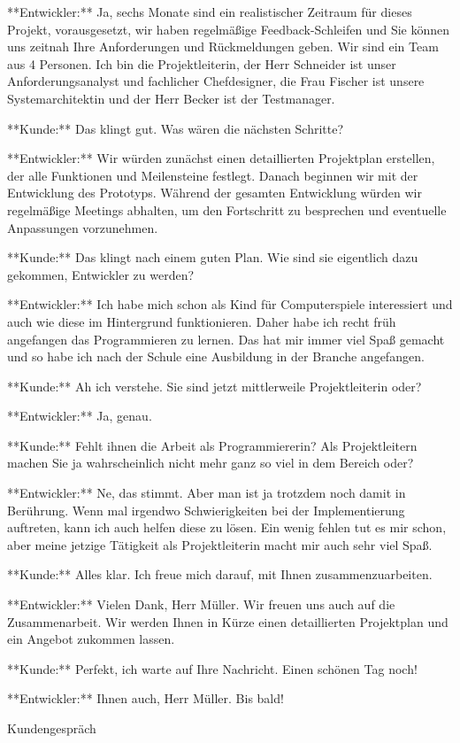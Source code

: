 \begin{prompt}[H]
    \begin{tcolorbox}[colback=gray!20, colframe=gray!20, boxrule=0pt, sharp corners] 
        **Entwickler:** Ja, sechs Monate sind ein realistischer Zeitraum für dieses Projekt, vorausgesetzt, wir haben regelmäßige Feedback-Schleifen und Sie können uns zeitnah Ihre Anforderungen und Rückmeldungen geben. Wir sind ein Team aus 4 Personen. Ich bin die Projektleiterin, der Herr Schneider ist unser Anforderungsanalyst und fachlicher Chefdesigner, die Frau Fischer ist unsere Systemarchitektin und der Herr Becker ist der Testmanager.
        
        **Kunde:** Das klingt gut. Was wären die nächsten Schritte?

        **Entwickler:** Wir würden zunächst einen detaillierten Projektplan erstellen, der alle Funktionen und Meilensteine festlegt. Danach beginnen wir mit der Entwicklung des Prototyps. Während der gesamten Entwicklung würden wir regelmäßige Meetings abhalten, um den Fortschritt zu besprechen und eventuelle Anpassungen vorzunehmen.
        
        **Kunde:** Das klingt nach einem guten Plan. Wie sind sie eigentlich dazu gekommen, Entwickler zu werden?
        
        **Entwickler:** Ich habe mich schon als Kind für Computerspiele interessiert und auch wie diese im Hintergrund funktionieren. Daher habe ich recht früh angefangen das Programmieren zu lernen. Das hat mir immer viel Spaß gemacht und so habe ich nach der Schule eine Ausbildung in der Branche angefangen.
        
        **Kunde:** Ah ich verstehe. Sie sind jetzt mittlerweile Projektleiterin oder?
        
        **Entwickler:** Ja, genau.
        
        **Kunde:** Fehlt ihnen die Arbeit als Programmiererin? Als Projektleitern machen Sie ja wahrscheinlich nicht mehr ganz so viel in dem Bereich oder?
        
        **Entwickler:** Ne, das stimmt. Aber man ist ja trotzdem noch damit in Berührung. Wenn mal irgendwo Schwierigkeiten bei der Implementierung auftreten, kann ich auch helfen diese zu lösen. Ein wenig fehlen tut es mir schon, aber meine jetzige Tätigkeit als Projektleiterin macht mir auch sehr viel Spaß.
        
        **Kunde:** Alles klar. Ich freue mich darauf, mit Ihnen zusammenzuarbeiten.
        
        **Entwickler:** Vielen Dank, Herr Müller. Wir freuen uns auch auf die Zusammenarbeit. Wir werden Ihnen in Kürze einen detaillierten Projektplan und ein Angebot zukommen lassen.
        
        **Kunde:** Perfekt, ich warte auf Ihre Nachricht. Einen schönen Tag noch!
        
        **Entwickler:** Ihnen auch, Herr Müller. Bis bald!
        \vfill
    \end{tcolorbox}
    \caption{Kundengespräch}
    \label{Kundengespräch2}
\end{prompt}

